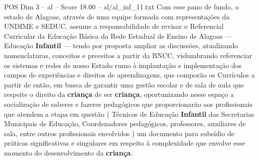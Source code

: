 \begin{textsample}{POS Dim 3 – al – Score 18.00 – al/al\_inf\_11.txt}
Com esse pano de fundo, o estado de Alagoas, através de uma equipe formada com representações da UNDIME e SEDUC, assume a responsabilidade de revisar o Referencial Curricular da Educação Básica da Rede Estadual de Ensino de Alagoas — Educação \textbf{Infantil} — tendo por proposta ampliar as discussões, atualizando nomenclaturas, conceitos e preceitos a partir da BNCC, vislumbrando referenciar os sistemas e redes de nosso Estado rumo à implantação e implementação dos campos de experiências e direitos de aprendizagens, que comporão os Currículos a partir de então, em busca de garantir uma gestão escolar e de sala de aula que respeite o direito da \textbf{criança} de ser \textbf{criança}, oportunizando nesse espaço a socialização de saberes e fazeres pedagógicos que proporcionarão aos profissionais que atendem a etapa em questão ( Técnicos de Educação \textbf{Infantil} das Secretarias Municipais de Educação, Coordenadores pedagógicos, professores, auxiliares de sala, entre outros profissionais envolvidos ) um documento para subsídio de práticas significativas e singulares em respeito à complexidade que envolve esse momento do desenvolvimento da \textbf{criança}.

\end{textsample}
